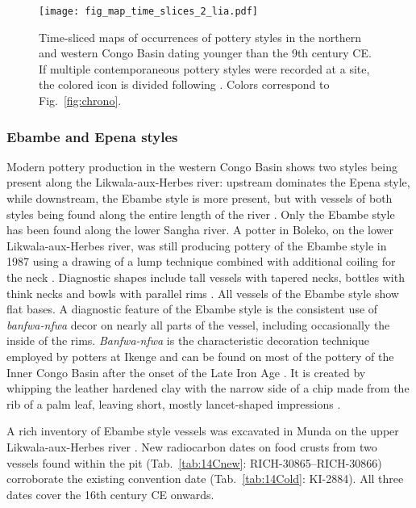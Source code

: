\documentclass[smallextended,natbib]{svjour3}       %
\begin{document}
\begin{figure}[!tbp]
	\centering
	\texttt{[image: fig\_map\_time\_slices\_2\_lia.pdf]}
	\caption{Time-sliced maps of occurrences of pottery styles in the northern and western Congo Basin dating younger than the 9th century CE. If multiple contemporaneous pottery styles were recorded at a site, the colored icon is divided following \citet[218--244 Fig.~100--107]{Seidensticker.2021e}. Colors correspond to Fig.~\ref{fig:chrono}.}
	\label{fig:timeslices_2_lia}
\end{figure}

\subsubsection*{Ebambe and Epena styles}

Modern pottery production in the western Congo Basin shows two styles being present along the Likwala-aux-Herbes river: upstream dominates the Epena style, while downstream, the Ebambe style is more present, but with vessels of both styles being found along the entire length of the river \citep[131--141]{Seidensticker.2021e}. Only the Ebambe style has been found along the lower Sangha river. A potter in Boleko, on the lower Likwala-aux-Herbes river, was still producing pottery of the Ebambe style in 1987 using a drawing of a lump technique combined with additional coiling for the neck \citep{Eggert.inVorb.}. Diagnostic  shapes include tall vessels with tapered necks, bottles with think necks and bowls with parallel rims \citep[Fig.~\ref{fig:sangha}.13--14;][132 Fig.~57]{Seidensticker.2021e}. All vessels of the Ebambe style show flat bases. A diagnostic feature of the Ebambe style is the consistent use of \textit{banfwa-nfwa} decor on nearly all parts of the vessel, including occasionally the inside of the rims. \textit{Banfwa-nfwa} is the characteristic decoration technique employed by potters at Ikenge \citep[399]{Eggert.1980c} and can be found on most of the pottery of the Inner Congo Basin after the onset of the Late Iron Age \citep[109--111]{Wotzka.1995}. It is created by whipping the leather hardened clay with the narrow side of a chip made from the rib of a palm leaf, leaving short, mostly lancet-shaped impressions \citep[Fig.~\ref{fig:sangha}.13--14; \ref{fig:ubangi}.16,25;][386 Ftn.~5]{Eggert.1980b}.

A rich inventory of Ebambe style vessels was excavated in Munda on the upper Likwala-aux-Herbes river \citep[311--321]{Seidensticker.2021e}. New radiocarbon dates on food crusts from two vessels found within the pit (Tab.~\ref{tab:14Cnew}: RICH-30865--RICH-30866) corroborate the existing convention date (Tab.~\ref{tab:14Cold}: KI-2884). All three dates cover the 16th century CE onwards.
\end{document}
